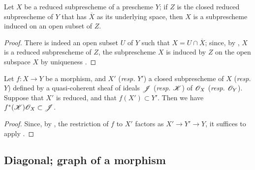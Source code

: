 \begin{prop}[5.2.2]
\label{1.5.2.2}
Let $X$ be a reduced subprescheme of a prescheme $Y$; if $Z$ is the closed reduced subprescheme of $Y$ that has $\overline{X}$ as its underlying space, then $X$ is a subprescheme induced on an open subset of $Z$.
\end{prop}

\begin{proof}
\label{proof-1.5.2.2}
There is indeed an open subset $U$ of $Y$ such that $X=U\cap\overline{X}$;
since, by , $X$ is a reduced subprescheme of $Z$, the subprescheme $X$ is induced by $Z$ on the open subspace $X$ by uniqueness .
\end{proof}

\begin{cor}[5.2.4]
\label{1.5.2.4}
Let $f:X\to Y$ be a morphism, and $X'$ (\emph{resp.} $Y'$) a closed subprescheme of $X$ (\emph{resp.} $Y$) defined by a quasi-coherent sheaf of ideals $\mathscr{J}$ (\emph{resp.} $\mathscr{K}$) of $\mathscr{O}_X$ (\emph{resp.} $\mathscr{O}_Y$).
Suppose that $X'$ is reduced, and that $f(X')\subset Y'$.
Then we have $f^*(\mathscr{K})\mathscr{O}_X\subset\mathscr{J}$.
\end{cor}

\begin{proof}
\label{proof-1.5.2.4}
Since, by , the restriction of $f$ to $X'$ factors as $X'\to Y'\to Y$, it suffices to apply .
\end{proof}

\subsection{Diagonal; graph of a morphism}
\label{subsection-diagonal-graph-of-a-morphism}
